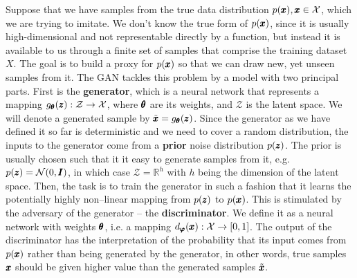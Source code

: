 Suppose that we have samples from the true data distribution $p(\pmb{{x}}),\pmb{{x}}\in\mathcal{X}$, which we are trying to imitate. We don't know the true form of $p(\pmb{{x}})$, since it is usually high-dimensional and not representable directly by a function, but instead it is available to us through a finite set of samples that comprise the training dataset $X$. The goal is to build a proxy for $p(\pmb{{x}})$ so that we can draw new, yet unseen samples from it. The GAN tackles this problem by a model with two principal parts. First is the \textbf{generator}, which is a neural network that represents a mapping $g_{\pmb{{\theta}}}(\pmb{{z}}):\mathcal{Z}\rightarrow\mathcal{X}$, where $\pmb{{\theta}}$ are its weights, and $\mathcal{Z}$ is the latent space. We will denote a generated sample by $\tilde{\pmb{{x}}} = g_{\pmb{{\theta}}}(\pmb{{z}})$. Since the generator as we have defined it so far is deterministic and we need to cover a random distribution, the inputs to the generator come from a \textbf{prior} noise distribution $p(\pmb{{z}})$. The prior is usually chosen such that it it easy to generate samples from it, e.g. $p(\pmb{{z}}) = \mathcal{N}(0,\pmb{{I}})$, in which case $\mathcal{Z} = \mathbb{R}^h$ with $h$ being the dimension of the latent space. Then, the task is to train the generator in such a fashion that it learns the potentially highly non--linear mapping from $p(\pmb{{z}})$ to $p(\pmb{{x}})$. This is stimulated by the adversary of the generator -- the \textbf{discriminator}. We define it as a neural network with weights $\pmb{{\theta}}$, i.e. a mapping $d_{\vc{\varphi}}(\vc{x}):\mathcal{X}\rightarrow\left[0,1\right]$. The output of the discriminator has the interpretation of the probability that its input comes from $p(\pmb{{x}})$ rather than being generated by the generator, in other words, true samples $\pmb{{x}}$ should be given higher value than the generated samples $\tilde{\pmb{{x}}}$.

